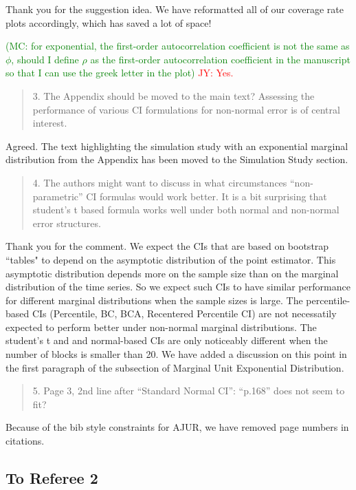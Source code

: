\documentclass[12pt]{article}
\newcommand{\jy}[1]{\textcolor{red}{JY: #1}}
\newcommand{\mc}[1]{\textcolor{green}{(MC: #1)}}
\newenvironment{comment}%
{\begin{quotation}\noindent\small\it\color{darkblue}\ignorespaces%
}{\end{quotation}}
\begin{document}
Thank you for the suggestion idea. We have reformatted all of our coverage rate plots 
accordingly, which has saved a lot of space!

\mc{for exponential, the first-order autocorrelation coefficient
is not the same as $\phi$, should I define $\rho$ as the first-order 
autocorrelation coefficient in the manuscript so that I can use the greek letter
in the plot}
\jy{Yes.}

\begin{comment}
3. The Appendix should be moved to the main text? Assessing the performance of 
various CI formulations for non-normal error is of central interest.
\end{comment} 

Agreed. The text highlighting the simulation study with an exponential marginal
distribution from the Appendix has been moved to the Simulation Study 
section. 


\begin{comment}
4. The authors might want to discuss in what circumstances “non-parametric” CI 
formulas would work better. It is a bit surprising that student’s t based 
formula works well under both normal and non-normal error structures.
\end{comment}

Thank you for the comment. We expect the CIs that 
are based on bootstrap ``tables" to depend on the 
asymptotic distribution of the point estimator. This asymptotic
distribution depends more on the sample size than on the marginal
distribution of the time series. So we expect such CIs to 
have similar performance for different marginal distributions when the
sample sizes is large.  The percentile-based CIs (Percentile, BC, BCA,
Recentered Percentile CI) are not necessatily expected to perform
better under non-normal marginal distributions. The student's t and
and normal-based CIs are only noticeably different when the number of
blocks is smaller than 20. We have added a discussion on this point in
the first paragraph of the subsection of Marginal Unit Exponential
Distribution.


\begin{comment}
5. Page 3, 2nd line after “Standard Normal CI”: “p.168” does not seem to fit?
\end{comment}

Because of the bib style constraints for AJUR, we have removed page numbers in 
citations.

\subsection*{To Referee 2}
\end{document}
